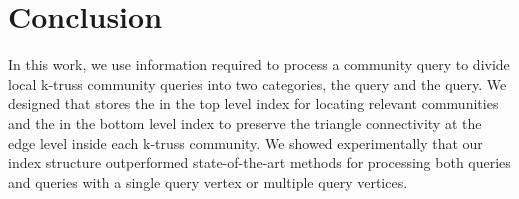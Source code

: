 \section{Conclusion}
\label{conclusion}

In this work, we use information required to process a community query to divide local k-truss community queries into two categories, the \toplevelprob{} query and the \bottomlevelprob{} query. We designed \twolevelindex{} that stores the \treeindex{} in the top level index for locating relevant communities and the \inducedgraph{} in the bottom level index to preserve the triangle connectivity at the edge level inside each k-truss community. 
We showed experimentally that our index structure outperformed state-of-the-art methods for processing both \toplevelprob{} queries and \bottomlevelprob{} queries with a single query vertex or multiple query vertices.